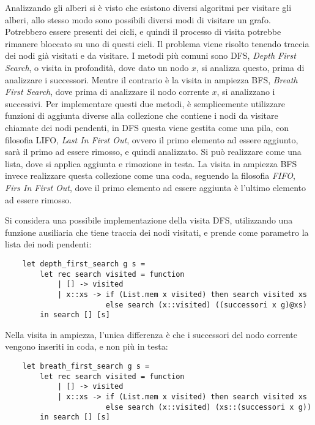 \documentclass{article}
\numberwithin{equation}{subsection}
\begin{document}
Analizzando gli alberi si è visto che esistono diversi algoritmi per visitare gli alberi, allo stesso modo sono possibili diversi modi di visitare un grafo. Potrebbero essere presenti dei cicli, e quindi il processo di visita potrebbe rimanere bloccato su uno di questi cicli. Il problema viene risolto tenendo traccia dei nodi già visitati e da visitare. 
I metodi più comuni sono DFS, \textit{Depth First Search}, o visita in profondità, dove dato un nodo $x$, si analizza questo, prima di analizzare i successori. Mentre il contrario è la visita in ampiezza BFS, \textit{Breath First Search}, dove prima di analizzare il nodo corrente $x$, si analizzano i successivi. 
Per implementare questi due metodi, è semplicemente utilizzare funzioni di aggiunta diverse alla collezione che contiene i nodi da visitare chiamate dei nodi pendenti, in DFS questa viene gestita come una pila, con filosofia LIFO, \textit{Last In First Out}, ovvero il primo elemento ad essere aggiunto, sarà il primo ad essere rimosso, e quindi analizzato. Si può realizzare come una lista, dove si applica aggiunta e rimozione in testa. 
La visita in ampiezza BFS invece realizzare questa collezione come una coda, seguendo la filosofia \textit{FIFO}, \textit{Firs In First Out}, dove il primo elemento ad essere aggiunta è l'ultimo elemento ad essere rimosso. 

Si considera una possibile implementazione della visita DFS, utilizzando una funzione ausiliaria che tiene traccia dei nodi visitati, e prende come parametro la lista dei nodi pendenti:
\begin{verbatim}
    let depth_first_search g s = 
        let rec search visited = function
            | [] -> visited
            | x::xs -> if (List.mem x visited) then search visited xs
                       else search (x::visited) ((successori x g)@xs)
        in search [] [s]
\end{verbatim}
Nella visita in ampiezza, l'unica differenza è che i successori del nodo corrente vengono inseriti in coda, e non più in testa:
\begin{verbatim}
    let breath_first_search g s = 
        let rec search visited = function
            | [] -> visited
            | x::xs -> if (List.mem x visited) then search visited xs
                       else search (x::visited) (xs::(successori x g))
        in search [] [s]        
\end{verbatim}
\end{document}
